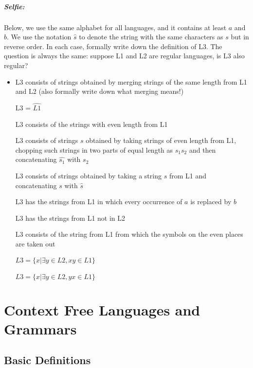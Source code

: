 \paragraph{Selfie:}
Below, we use the same alphabet for all languages, and it contains at
least $a$ and $b$.  We use the notation $\hat{s}$ to denote the string
with the same characters as $s$ but in reverse order. In each case,
formally write down the definition of L3. The question is always the
same: suppose L1 and L2 are regular languages, is L3 also regular?
\begin{itemize}
\item[]
L3 consists of strings obtained by merging strings of the same length
from L1 and L2 (also formally write down what merging means!)

L3 = $\widehat{L1}$

L3 consists of the strings with even length from L1

L3 consists of strings $s$ obtained by taking strings of even length
from L1, chopping such strings in two parts of equal length
as $s_1s_2$ and then concatenating $\widehat{s_1}$ with $s_2$

L3 consists of strings obtained by taking a string $s$ from L1 and
concatenating $s$ with $\hat{s}$

L3 has the strings from L1 in which every occurrence of $a$ is
replaced by $b$

L3 has the strings from L1 not in L2

L3 consists of the string from L1 from which the symbols on the even
places are taken out

$L3 = \{x|\exists y \in L2, xy \in L1\}$

$L3 = \{x|\exists y \in L2, yx \in L1\}$

\end{itemize}



\chapter{Context Free Languages and Grammars}\label{contextvrijelanguages}

\section{Basic Definitions}

